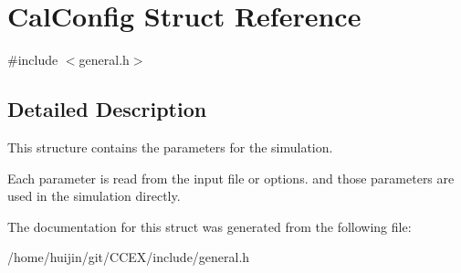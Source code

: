 \hypertarget{structCalConfig}{\section{Cal\-Config Struct Reference}
\label{structCalConfig}
}


{\ttfamily \#include $<$general.\-h$>$}



\subsection{Detailed Description}
This structure contains the parameters for the simulation. 

Each parameter is read from the input file or options. and those parameters are used in the simulation directly. 

The documentation for this struct was generated from the following file\-:\begin{DoxyCompactItemize}
\item 
/home/huijin/git/\-C\-C\-E\-X/include/general.\-h\end{DoxyCompactItemize}

